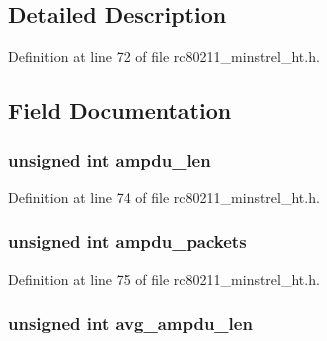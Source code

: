 \subsection{Detailed Description}


Definition at line 72 of file rc80211\-\_\-minstrel\-\_\-ht.\-h.



\subsection{Field Documentation}
\hypertarget{structminstrel__ht__sta_a81226895623781d8762fd45b25d44ae2}{
\subsubsection[{ampdu\-\_\-len}]{\setlength{\rightskip}{0pt plus 5cm}unsigned int ampdu\-\_\-len}}\label{structminstrel__ht__sta_a81226895623781d8762fd45b25d44ae2}


Definition at line 74 of file rc80211\-\_\-minstrel\-\_\-ht.\-h.

\hypertarget{structminstrel__ht__sta_a0cc9c3c7d1f2e54ec3dcf85c128d5d86}{
\subsubsection[{ampdu\-\_\-packets}]{\setlength{\rightskip}{0pt plus 5cm}unsigned int ampdu\-\_\-packets}}\label{structminstrel__ht__sta_a0cc9c3c7d1f2e54ec3dcf85c128d5d86}


Definition at line 75 of file rc80211\-\_\-minstrel\-\_\-ht.\-h.

\hypertarget{structminstrel__ht__sta_a7615bb62088013811f751b053ca9045d}{
\subsubsection[{avg\-\_\-ampdu\-\_\-len}]{\setlength{\rightskip}{0pt plus 5cm}unsigned int avg\-\_\-ampdu\-\_\-len}}\label{structminstrel__ht__sta_a7615bb62088013811f751b053ca9045d}


